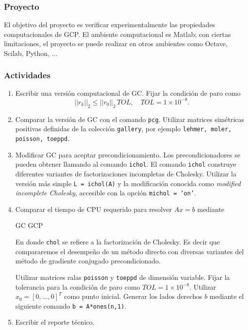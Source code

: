 \documentclass[12pt]{article}
\begin{document}
\subsubsection*{Proyecto} 
 El objetivo del proyecto es verificar experimentalmente las propiedades computacionales de GCP. El ambiente computacional es  {\sc Matlab}; con ciertas limitaciones, el proyecto se puede realizar en otros ambientes como {\sc Octave}, {\sc Scilab}, 
 {\sc Python}, $\ldots$
 
 
 
 \subsubsection*{Actividades}

  \begin{enumerate}
   \item Escribir una versi\'on computacional de GC. Fijar la condici\'on de paro como
         \[
               ||r_k||_2 \le ||r_0||_2 \,TOL, \quad TOL = 1 \times 10^{-8}.
         \]
   \item Comparar la versi\'on de GC con el comando {\tt pcg}. Utilizar matrices sim\'etricas positivas 
         definidas de la colecci\'on {\tt gallery}, por ejemplo {\tt lehmer, moler, poisson, toeppd}.
   \item Modificar GC para aceptar precondicionamiento. Los precondicionadores se pueden obtener llamando al comando
         {\tt ichol}. El comando {\tt ichol} construye diferentes variantes de factorizaciones incompletas de Cholesky. Utilizar la versi\'on m\'as simple {\tt L = ichol(A)}  y la modificaci\'on conocida como {\em modified incomplete Cholesky}, accesible con la opci\'on {\tt michol = 'on'}.
   \item Comparar el tiempo de CPU requerido para resolver $Ax = b$ mediante
   
         \medskip
   
         \centerline{  GC  \qquad GCP    }
         
         \medskip
   
         En donde {\tt chol} se refiere a la factorizaci\'on de Cholesky. Es decir que compararemos el desempe\~no de un 
         m\'etodo directo con diversas variantes del m\'etodo de gradiente conjugado precondicionado.
         
          Utilizar  matrices ralas {\tt poisson} y  {\tt toeppd} de dimensi\'on variable. Fijar la tolerancia para la condici\'on de paro como $TOL = 1 \times 10^{-8}$. Utilizar $x_0 = [0, \ldots, 0]^T$ como punto inicial. Generar los lados derechos $b$ mediante el siguiente comando {\tt b = A*ones(n,1)}.
         
   \item Escribir el reporte t\'ecnico.
   
   \end{enumerate}


 
\end{document}
